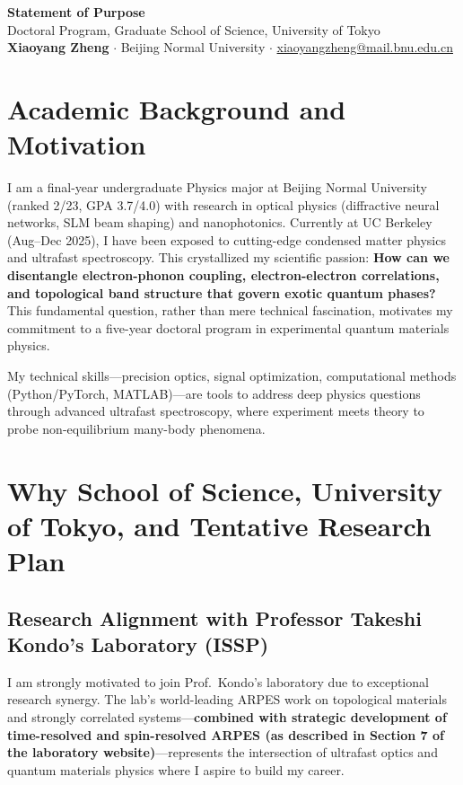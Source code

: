 \documentclass[11pt,a4paper]{article}
\begin{document}
\begin{center}
    {\large \textbf{Statement of Purpose}}\\[0.2em]
    {\normalsize Doctoral Program, Graduate School of Science, University of Tokyo}\\[0.5em]
    \textbf{Xiaoyang Zheng} $\cdot$ Beijing Normal University $\cdot$ \href{mailto:xiaoyangzheng@mail.bnu.edu.cn}{xiaoyangzheng@mail.bnu.edu.cn}
\end{center}

\vspace{-0.4em}

\section{Academic Background and Motivation}

I am a final-year undergraduate Physics major at Beijing Normal University (ranked 2/23, GPA 3.7/4.0) with research in optical physics (diffractive neural networks, SLM beam shaping) and nanophotonics. Currently at UC Berkeley (Aug--Dec 2025), I have been exposed to cutting-edge condensed matter physics and ultrafast spectroscopy. This crystallized my scientific passion: \textbf{How can we disentangle electron-phonon coupling, electron-electron correlations, and topological band structure that govern exotic quantum phases?} This fundamental question, rather than mere technical fascination, motivates my commitment to a five-year doctoral program in experimental quantum materials physics.

My technical skills—precision optics, signal optimization, computational methods (Python/PyTorch, MATLAB)—are tools to address deep physics questions through advanced ultrafast spectroscopy, where experiment meets theory to probe non-equilibrium many-body phenomena.

\section{Why School of Science, University of Tokyo, and Tentative Research Plan}

\subsection{Research Alignment with Professor Takeshi Kondo's Laboratory (ISSP)}

I am strongly motivated to join Prof.~Kondo's laboratory due to exceptional research synergy. The lab's world-leading ARPES work on topological materials and strongly correlated systems—\textbf{combined with strategic development of time-resolved and spin-resolved ARPES (as described in Section 7 of the laboratory website)}—represents the intersection of ultrafast optics and quantum materials physics where I aspire to build my career.
\end{document}
